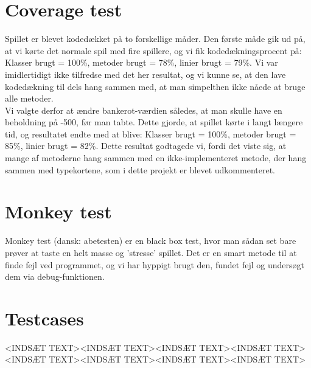 \section{Coverage test}
Spillet er blevet kodedækket på to forskellige måder.
Den første måde gik ud på, at vi kørte det normale spil med fire spillere, og vi fik kodedækningsprocent på: Klasser brugt = 100\%, metoder brugt = 78\%, linier brugt = 79\%.
Vi var imidlertidigt ikke tilfredse med det her resultat, og vi kunne se, at den lave kodedækning til dels hang sammen med, at man simpelthen ikke nåede at bruge alle metoder.
\\ Vi valgte derfor at ændre bankerot-værdien således, at man skulle have en beholdning på -500, før man tabte. Dette gjorde, at spillet kørte i langt længere tid, og resultatet endte med at blive: Klasser brugt = 100\%, metoder brugt = 85\%, linier brugt = 82\%.
Dette resultat godtagede vi, fordi det viste sig, at mange af metoderne hang sammen med en ikke-implementeret metode, der hang sammen med typekortene, som i dette projekt er blevet udkommenteret.

\section{Monkey test}
Monkey test (dansk: abetesten) er en black box test, hvor man sådan set bare prøver at taste en helt masse og 'stresse' spillet.
Det er en smart metode til at finde fejl ved programmet, og vi har hyppigt brugt den, fundet fejl og undersøgt dem via debug-funktionen.

\section{Testcases}
<INDSÆT TEXT><INDSÆT TEXT><INDSÆT TEXT><INDSÆT TEXT><INDSÆT TEXT><INDSÆT TEXT><INDSÆT TEXT><INDSÆT TEXT>